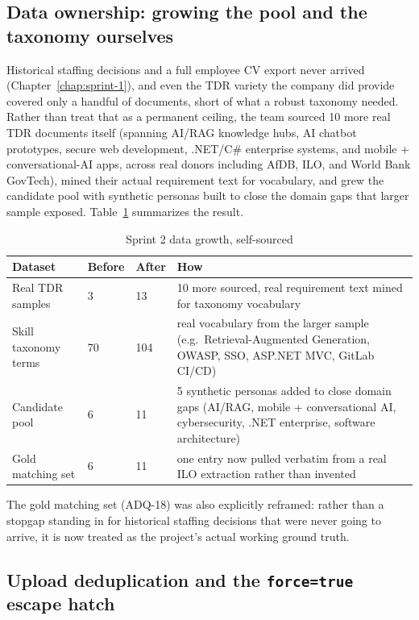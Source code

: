 \subsection{Data ownership: growing the pool and the taxonomy ourselves}
\label{sec:s2-data-ownership}

Historical staffing decisions and a full employee CV export never
arrived (Chapter~\ref{chap:sprint-1}), and even the TDR variety the
company did provide covered only a handful of documents, short of what
a robust taxonomy needed. Rather than treat that as a permanent ceiling,
the team sourced 10 more real TDR documents itself (spanning AI/RAG
knowledge hubs, AI chatbot prototypes, secure web development, .NET/C\#
enterprise systems, and mobile + conversational-AI apps, across real
donors including AfDB, ILO, and World Bank GovTech), mined their actual
requirement text for vocabulary, and grew the candidate pool with
synthetic personas built to close the domain gaps that larger sample
exposed. Table~\ref{tab:s2-data-growth} summarizes the result.

\begin{table}[H]
  \centering
  \caption{Sprint 2 data growth, self-sourced}
  \label{tab:s2-data-growth}
  \begin{tabular}{@{}p{4cm}p{1.5cm}p{1.5cm}p{9.5cm}@{}}
    \toprule
    Dataset & Before & After & How \\
    \midrule
    Real TDR samples & 3 & 13 & 10 more sourced, real requirement text mined for taxonomy vocabulary \\
    Skill taxonomy terms & 70 & 104 & real vocabulary from the larger sample (e.g.\ Retrieval-Augmented Generation, OWASP, SSO, ASP.NET MVC, GitLab CI/CD) \\
    Candidate pool & 6 & 11 & 5 synthetic personas added to close domain gaps (AI/RAG, mobile + conversational AI, cybersecurity, .NET enterprise, software architecture) \\
    Gold matching set & 6 & 11 & one entry now pulled verbatim from a real ILO extraction rather than invented \\
    \bottomrule
  \end{tabular}
\end{table}

The gold matching set (ADQ-18) was also explicitly reframed: rather
than a stopgap standing in for historical staffing decisions that were
never going to arrive, it is now treated as the project's actual
working ground truth.

\subsection{Upload deduplication and the \texttt{force=true} escape hatch}

